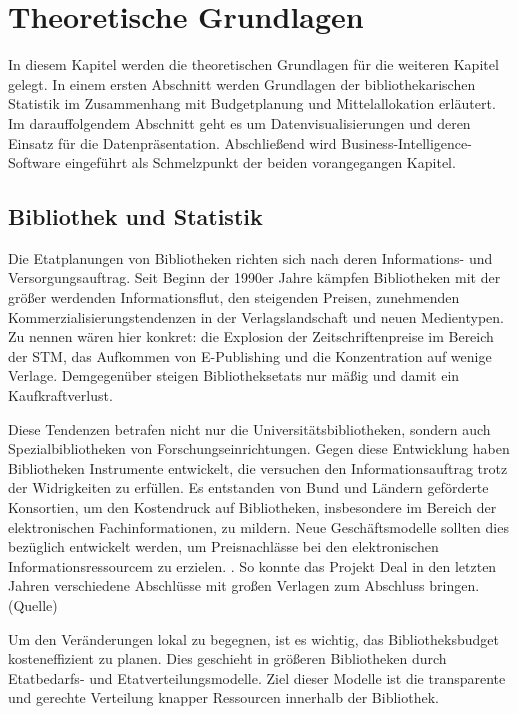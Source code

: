 \chapter{Theoretische Grundlagen}
\label{chap:two}
In diesem Kapitel werden die theoretischen Grundlagen für die weiteren Kapitel gelegt. In einem
ersten Abschnitt werden Grundlagen der bibliothekarischen Statistik im Zusammenhang mit Budgetplanung
und Mittelallokation erläutert. Im darauffolgendem Abschnitt geht es um Datenvisualisierungen und deren Einsatz
für die Datenpräsentation. Abschließend wird Business-Intelligence-Software eingeführt als Schmelzpunkt der 
beiden vorangegangen Kapitel.

\section{Bibliothek und Statistik}
\label{chap:two_one}
Die Etatplanungen von Bibliotheken richten sich nach deren Informations- und Versorgungsauftrag. 
Seit Beginn der 1990er Jahre kämpfen Bibliotheken mit der größer werdenden Informationsflut, den steigenden Preisen, 
zunehmenden Kommerzialisierungstendenzen in der Verlagslandschaft und neuen Medientypen. 
Zu nennen wären hier konkret: die Explosion der Zeitschriftenpreise im Bereich der \acrfull{STM},
das Aufkommen von E-Publishing und die Konzentration auf wenige Verlage. Demgegenüber steigen Bibliotheksetats nur mäßig und
damit ein Kaufkraftverlust. \cite[161]{moravetz-kuhlmann_monika_erwerbungspolitik_2015}

Diese Tendenzen betrafen nicht nur die Universitätsbibliotheken, sondern auch Spezialbibliotheken von Forschungseinrichtungen.
Gegen diese Entwicklung haben Bibliotheken Instrumente entwickelt, die versuchen den Informationsauftrag trotz der Widrigkeiten zu erfüllen.
Es entstanden von Bund und Ländern geförderte Konsortien, um den Kostendruck auf Bibliotheken, insbesondere im Bereich der elektronischen
Fachinformationen, zu mildern. Neue Geschäftsmodelle sollten dies bezüglich entwickelt werden, 
um Preisnachlässe bei den elektronischen Informationsressourcem zu erzielen. 
\cite[169 ff.]{moravetz-kuhlmann_monika_erwerbungspolitik_2015}. So konnte das Projekt Deal in den letzten Jahren 
verschiedene Abschlüsse mit großen Verlagen zum Abschluss bringen. (Quelle)



Um den Veränderungen lokal zu begegnen, ist es wichtig, das Bibliotheksbudget kosteneffizient zu planen. 
Dies geschieht in größeren Bibliotheken durch Etatbedarfs- und Etatverteilungsmodelle. 
Ziel dieser Modelle ist die transparente und gerechte Verteilung knapper Ressourcen innerhalb der Bibliothek. 

